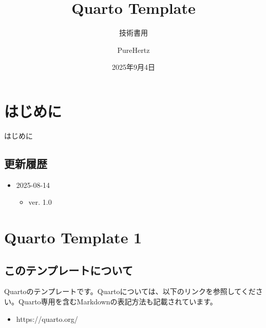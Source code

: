 \documentclass[
  japanese,
  letterpaper,
  lualatex,
  ja=standard,
  10pt,
  a4paper,
  textwidth-limit=50,
  openany]{bxjsbook}
\title{Quarto Template}
\subtitle{技術書用}
\author{PureHertz}
\date{2025年9月4日}
\providecommand{\tightlist}{%
  \setlength{\itemsep}{0pt}\setlength{\parskip}{0pt}}
\renewcommand*\contentsname{目次}
\newcommand\contentsname{目次}
\begin{document}
\maketitle

\renewcommand*\contentsname{目次}
{
\hypersetup{linkcolor=}
\setcounter{tocdepth}{1}
\tableofcontents
}


\chapter*{はじめに}\label{ux306fux3058ux3081ux306b}


はじめに

\section*{更新履歴}\label{ux66f4ux65b0ux5c65ux6b74}


\begin{itemize}
\tightlist
\item
  2025-08-14

  \begin{itemize}
  \tightlist
  \item
    ver. 1.0
  \end{itemize}
\end{itemize}


\chapter{Quarto Template 1}\label{quarto-template-1}

\section{このテンプレートについて}\label{ux3053ux306eux30c6ux30f3ux30d7ux30ecux30fcux30c8ux306bux3064ux3044ux3066}

Quartoのテンプレートです。Quartoについては、以下のリンクを参照してください。Quarto専用を含むMarkdownの表記方法も記載されています。

\begin{itemize}
\tightlist
\item
  https://quarto.org/
\end{itemize}
\end{document}
